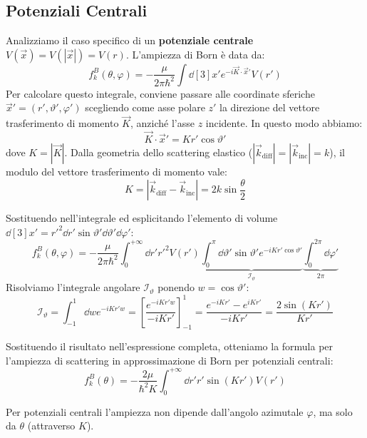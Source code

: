 
\subsection{Potenziali Centrali}


Analizziamo il caso specifico di un \textbf{potenziale centrale} \( V(\vec{x}) = V(|\vec{x}|) = V(r) \).
L'ampiezza di Born è data da:
\[
    f_k^B(\theta, \varphi) = -\frac{\mu}{2\pi\hbar^2} \int \dd[3]{x'} e^{-i \vec{K} \cdot \vec{x}'} V(r')
\]
Per calcolare questo integrale, conviene passare alle coordinate sferiche \( \vec{x}' = (r', \vartheta', \varphi') \) scegliendo come asse polare \( z' \) la direzione del vettore trasferimento di momento \( \vec{K} \), anziché l'asse \( z \) incidente.
In questo modo abbiamo:
\[
    \vec{K} \cdot \vec{x}' = K r' \cos\vartheta'
\]
dove \( K = |\vec{K}| \). Dalla geometria dello scattering elastico (\( |\vec{k}_{\text{diff}}| = |\vec{k}_{\text{inc}}| = k \)), il modulo del vettore trasferimento di momento vale:
\begin{equation}
    K = |\vec{k}_{\text{diff}} - \vec{k}_{\text{inc}}| = 2k \sin\frac{\theta}{2}
\end{equation}

Sostituendo nell'integrale ed esplicitando l'elemento di volume \( \dd[3]{x'} = r'^2 \dd{r'} \sin\vartheta' \dd{\vartheta'} \dd{\varphi'} \):
\[
    f_k^B(\theta, \varphi) = -\frac{\mu}{2\pi\hbar^2} \int_0^{+\infty} \dd{r'} r'^2 V(r') \underbrace{\int_0^{\pi} \dd{\vartheta'} \sin\vartheta' e^{-iKr'\cos\vartheta'}}_{\mathcal{I}_{\vartheta}} \underbrace{\int_0^{2\pi} \dd{\varphi'}}_{2\pi}
\]
Risolviamo l'integrale angolare \( \mathcal{I}_{\vartheta} \) ponendo \( w = \cos\vartheta' \):
\[
    \mathcal{I}_{\vartheta} = \int_{-1}^{1} \dd{w} e^{-iKr'w} = \left[ \frac{e^{-iKr'w}}{-iKr'} \right]_{-1}^{1} = \frac{e^{-iKr'} - e^{iKr'}}{-iKr'} = \frac{2\sin(Kr')}{Kr'}
\]

Sostituendo il risultato nell'espressione completa, otteniamo la formula per l'ampiezza di scattering in approssimazione di Born per potenziali centrali:
\begin{equation}
    f_k^B(\theta) = -\frac{2\mu}{\hbar^2 K} \int_0^{+\infty} \dd{r'} r' \sin(Kr') V(r')
\end{equation}
\begin{remark}
    Per potenziali centrali l'ampiezza non dipende dall'angolo azimutale \( \varphi \), ma solo da \( \theta \) (attraverso \( K \)).
\end{remark}

